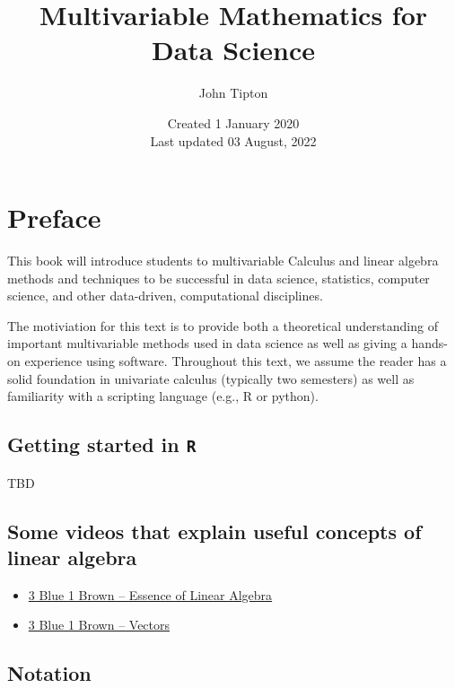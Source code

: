 \documentclass[
]{book}
\title{Multivariable Mathematics for Data Science}
\author{John Tipton}
\date{Created 1 January 2020\\
Last updated 03 August, 2022}
\theoremstyle{definition}
\theoremstyle{definition}
\theoremstyle{definition}
\theoremstyle{definition}
\theoremstyle{remark}
\begin{document}
\maketitle

{
\setcounter{tocdepth}{1}
\tableofcontents
}
\hypertarget{preface}{%
\chapter{Preface}\label{preface}}

This book will introduce students to multivariable Calculus and linear algebra methods and techniques to be successful in data science, statistics, computer science, and other data-driven, computational disciplines.

The motiviation for this text is to provide both a theoretical understanding of important multivariable methods used in data science as well as giving a hands-on experience using software. Throughout this text, we assume the reader has a solid foundation in univariate calculus (typically two semesters) as well as familiarity with a scripting language (e.g., R or python).

\hypertarget{getting-started-in-r}{%
\section{\texorpdfstring{Getting started in \texttt{R}}{Getting started in R}}\label{getting-started-in-r}}

TBD

\hypertarget{some-videos-that-explain-useful-concepts-of-linear-algebra}{%
\section{Some videos that explain useful concepts of linear algebra}\label{some-videos-that-explain-useful-concepts-of-linear-algebra}}

\begin{itemize}
\item
  \href{https://www.3blue1brown.com/lessons/eola-preview}{3 Blue 1 Brown -- Essence of Linear Algebra}
\item
  \href{https://www.3blue1brown.com/lessons/vectors}{3 Blue 1 Brown -- Vectors}
\end{itemize}

\hypertarget{notation}{%
\section{Notation}\label{notation}}
\end{document}

